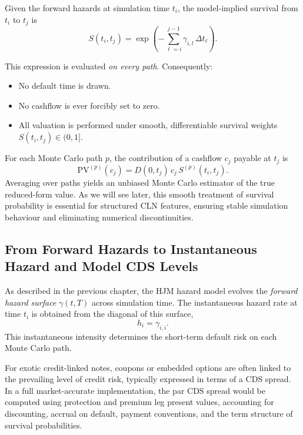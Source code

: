 Given the forward hazards at simulation time $t_i$, the model-implied survival
from $t_i$ to $t_j$ is
\[
S(t_i, t_j)
    = \exp\!\left(
        - \sum_{\ell=i}^{j-1}
           \gamma_{i,l}\,\Delta t_\ell
      \right).
\]

This expression is evaluated \emph{on every path}. Consequently:

\begin{itemize}
    \item No default time is drawn.
    \item No cashflow is ever forcibly set to zero.
    \item All valuation is performed under smooth, differentiable
          survival weights $S(t_i,t_j)\in(0,1]$.
\end{itemize}

For each Monte Carlo path $p$, the contribution of a cashflow $c_j$ payable at
$t_j$ is
\[
\mathrm{PV}^{(p)}(c_j)
    = D(0,t_j)\,c_j\,S^{(p)}(t_i, t_j).
\]
Averaging over paths yields an unbiased Monte Carlo estimator of the true
reduced-form value. As we will see later, this smooth
treatment of survival probability is essential for structured CLN features,
ensuring stable simulation behaviour and eliminating numerical discontinuities.



\subsection{From Forward Hazards to Instantaneous Hazard and Model CDS Levels}

As described in the previous chapter, the HJM hazard model evolves the \emph{forward hazard surface}
$\gamma(t,T)$ across simulation time. The instantaneous hazard rate at
time $t_i$ is obtained from the diagonal of this surface,
\[
h_i = \gamma_{i,i}.
\]
This instantaneous intensity determines the short-term default risk on
each Monte Carlo path.

For exotic credit-linked notes, coupons or
embedded options are often linked to the prevailing level of credit
risk, typically expressed in terms of a CDS spread. In a full
market-accurate implementation, the par CDS spread would be computed
using protection and premium leg present values, accounting for
discounting, accrual on default, payment conventions, and the term
structure of survival probabilities.

